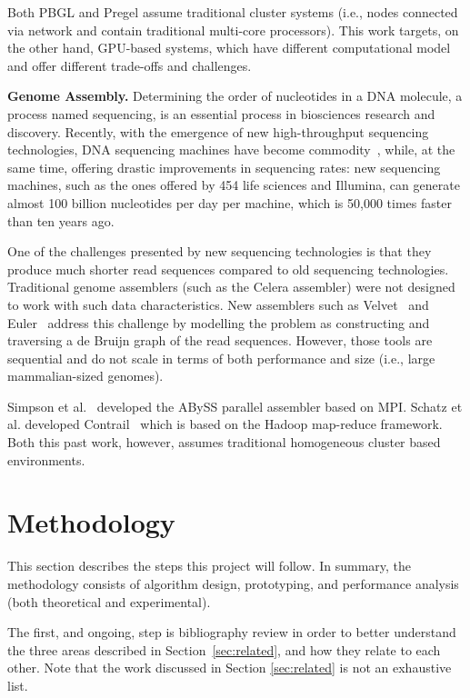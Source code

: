 \documentclass{acm_proc_article-sp}[12pt]
\begin{document}
Both PBGL and Pregel assume traditional cluster systems (i.e., nodes
connected via network and contain traditional multi-core
processors). This work targets, on the other hand, GPU-based systems,
which have different computational model and offer different trade-offs
and challenges.

{\bf Genome Assembly.} Determining the order of nucleotides in a DNA
molecule, a process named sequencing, is an essential process in
biosciences research and discovery. Recently, with the emergence of
new high-throughput sequencing technologies, DNA sequencing machines
have become commodity~\cite{venter2010multiple}, while, at the same
time, offering drastic improvements in sequencing rates: new
sequencing machines, such as the ones offered by 454 life sciences and
Illumina, can generate almost 100 billion nucleotides per day per
machine, which is 50,000 times faster than ten years ago. 

One of the challenges presented by new sequencing technologies is that
they produce much shorter read sequences compared to old sequencing
technologies. Traditional genome assemblers (such as the Celera
assembler) were not designed to work with such data
characteristics. New assemblers such as Velvet~\cite{Zerbino2008} and
Euler~\cite{pevzner2001eulerian} address this challenge by modelling
the problem as constructing and traversing a de Bruijn graph of the
read sequences. However, those tools are sequential and do not scale
in terms of both performance and size (i.e., large mammalian-sized
genomes). 

Simpson et al.~\cite{simpson2009abyss} developed the ABySS parallel
assembler based on MPI. Schatz et al. developed
Contrail~\cite{schatz2010high} which is based on the Hadoop map-reduce
framework. Both this past work, however, assumes traditional homogeneous
cluster based environments.

\section{Methodology}
\label{sec:methodology}
This section describes the steps this project will follow. In summary,
the methodology consists of algorithm design, prototyping, and
performance analysis (both theoretical and experimental).

The first, and ongoing, step is bibliography review in order to better
understand the three areas described in Section~\ref{sec:related}, and
how they relate to each other. Note that the work discussed in Section 
\ref{sec:related} is not an exhaustive list. 
\end{document}
